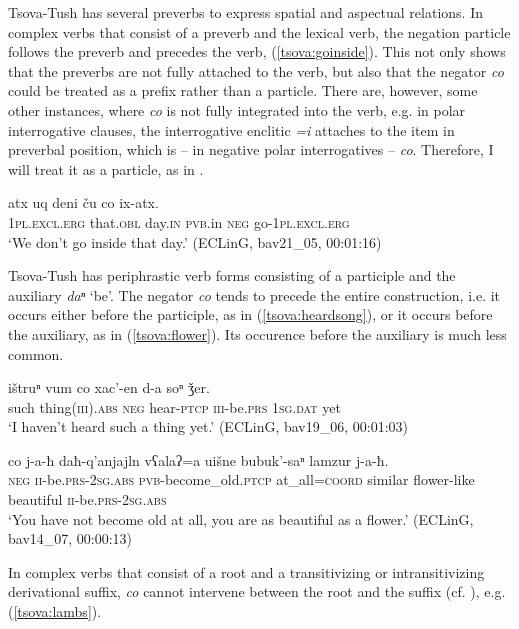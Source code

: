 \documentclass[output=paper,%
colorlinks,citecolor=brown,
showindex
]{langscibook}
\begin{document}
Tsova-Tush has several preverbs to express spatial and aspectual relations. In complex verbs that consist of a preverb and the lexical verb, the negation particle follows the preverb and precedes the verb, (\ref{tsova:goinside}).
This not only shows that the preverbs are not fully attached to the verb, but also that the negator \textit{co} could be treated as a prefix rather than a particle. There are, however, some other instances, where \textit{co} is not fully integrated into the verb, e.g. in polar interrogative clauses, the interrogative enclitic \textit{=i} attaches to the item in preverbal position, which is –  in negative polar interrogatives – \textit{co}. Therefore, I will treat it as a particle, as in .


\ea	\label{tsova:goinside}
\gll 	atx	uq	deni	ču	co	ix-atx.\\  
	\textsc{1pl.excl.erg} that.\textsc{obl} day.\textsc{in} \textsc{pvb}.in \textsc{neg} go-\textsc{1pl.excl.erg}\\
\glt `We don’t go inside that day.' (ECLinG, bav21\_05, 00:01:16)
\z

Tsova-Tush has periphrastic verb forms consisting of a participle and the auxiliary \textit{ daⁿ} `be'. The negator \textit{co} tends to precede the entire construction, i.e. it occurs either before the participle, as in (\ref{tsova:heardsong}), or it occurs before the auxiliary, as in (\ref{tsova:flower}). Its occurence before the auxiliary is much less common. 


\ea	\label{tsova:heardsong}
\gll 	ištruⁿ	vum	co	xac’-en	d-a	soⁿ  ǯer.\\  
	such thing\textsc{(iii).abs} \textsc{neg} hear-\textsc{ptcp} \textsc{iii}-be.\textsc{prs} \textsc{1sg.dat} yet\\
\glt `I haven’t heard such a thing yet.' (ECLinG, bav19\_06, 00:01:03)
\z

\ea	\label{tsova:flower}
\gll 	co j-a-ħ daħ-q'anjajln vʕalaʔ=a uišne bubuk'-saⁿ lamzur j-a-ħ.\\  
	\textsc{neg} \textsc{ii}-be.\textsc{prs}-\textsc{2sg.abs} \textsc{pvb}-become\_old.\textsc{ptcp} at\_all=\textsc{coord} similar  flower-like beautiful  \textsc{ii}-be.\textsc{prs}-\textsc{2sg.abs}\\
\glt `You have not become old at all, you are as beautiful as a flower.' (ECLinG, bav14\_07, 00:00:13)
\z

In complex verbs that consist of a root and a transitivizing or intransitivizing derivational suffix, \textit{co} cannot intervene between the root and the suffix (cf.  \citet{Harris2009}), e.g.  (\ref{tsova:lambs}).
\end{document}
